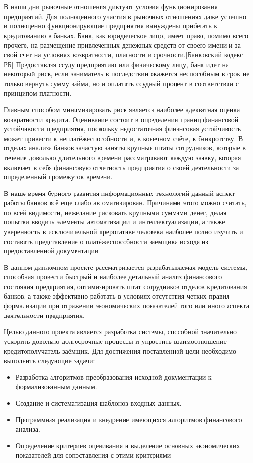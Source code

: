 \label{sec:intro}


В наши дни рыночные отношения диктуют условия функционирования предприятий. Для полноценного участия в рыночных отношениях даже успешно и полноценно функционирующие предприятия вынуждены прибегать к кредитованию в банках. Банк, как юридическое лицо, имеет право, помимо всего прочего, на размещение привлеченных денежных средств от своего имени и за свой счет на условиях возвратности, платности и срочности.[Банковский кодекс РБ]
Предоставляя ссуду предприятию или физическому лицу, банк идет на некоторый риск, если заниматель в последствии окажется неспособным в срок не только вернуть сумму займа, но и оплатить ссудный процент в соответствии с принципом платности.

Главным способом минимизировать риск является наиболее адекватная оценка возвратности кредита. Оценивание состоит в определении границ финансовой устойчивости предприятия, поскольку недостаточная финансовая устойчивость может привести к неплатёжеспособности и, в конечном счёте, к банкротству.
В отделах анализа банков зачастую заняты крупные штаты сотрудников, которые в течение довольно длительного времени рассматривают каждую заявку, которая включает в себя финансовую отчетность предприятия о своей деятельности за определенный промежуток времени.

В наше время бурного развития информационных технологий данный аспект работы банков всё еще слабо автоматизирован. Причинами этого можно считать, по всей видимости, нежелание рисковать крупными суммами денег, делая попытки вводить элементы автоматизации и интеллектуализации, а также уверенность в исключительной прерогативе человека наиболее полно изучить и составить представление о платёжеспособности заемщика исходя из предоставленной документации

В данном дипломном проекте рассматривается разрабатываемая модель системы, способная провести быстрый и наиболее детальный анализ финансового состояния предприятия, оптимизировать штат сотрудников отделов кредитования банков, а также эффективно работать в условиях отсутствия четких правил формализации при отражении экономических показателей того или иного аспекта деятельности предприятия.

Целью данного проекта является разработка системы, способной значительно ускорить довольно долгосрочные процессы и упростить взаимоотношение кредитополучатель-заёмщик. Для достижения поставленной цели необходимо выполнить следующие задачи: 
\begin{itemize}
\item Разработка алгоритмов преобразования исходной документации к формализованным данным.
\item Создание и систематизация шаблонов входных данных.
\item Программная реализация и внедрение имеющихся алгоритмов финансового анализа.
\item Определение критериев оценивания и выделение основных экономических показателей для сопоставления с этими критериями
\end{itemize}

